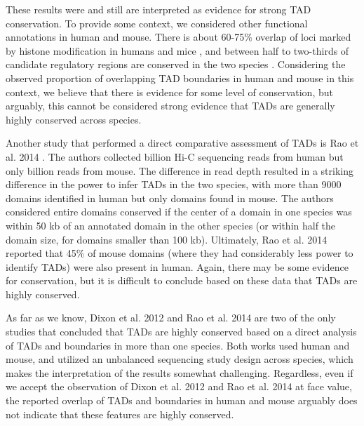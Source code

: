 These results were and still are interpreted as evidence for strong TAD conservation. To provide some context, we considered other functional annotations in human and mouse. There is about 60-75\% overlap of loci marked by histone modification in humans and mice \cite{Woo.2012}, and between half to two-thirds of candidate regulatory regions are conserved in the two species \cite{Yue.2014}. Considering the observed proportion of overlapping TAD boundaries in human and mouse in this context, we believe that there is evidence for some level of conservation, but arguably, this cannot be considered strong evidence that TADs are generally highly conserved across species.

Another study that performed a direct comparative assessment of TADs is Rao et al. 2014 \cite{Rao.2014}. The authors collected  billion Hi-C sequencing reads from human but only  billion reads from mouse. The difference in read depth resulted in a striking difference in the power to infer TADs in the two species, with more than 9000 domains identified in human but only  domains found in mouse. The authors considered entire domains conserved if the center of a domain in one species was within 50 kb of an annotated domain in the other species (or within half the domain size, for domains smaller than 100 kb). Ultimately, Rao et al. 2014 reported that 45\% of mouse domains (where they had considerably less power to identify TADs) were also present in human. Again, there may be some evidence for conservation, but it is difficult to conclude based on these data that TADs are highly conserved. 

As far as we know, Dixon et al. 2012 and Rao et al. 2014 are two of the only studies that concluded that TADs are highly conserved based on a direct analysis of TADs and boundaries in more than one species. Both works used human and mouse, and utilized an unbalanced sequencing study design across species, which makes the interpretation of the results somewhat challenging. Regardless, even if we accept the observation of Dixon et al. 2012 and Rao et al. 2014 at face value, the reported overlap of TADs and boundaries in human and mouse arguably does not indicate that these features are highly conserved.

